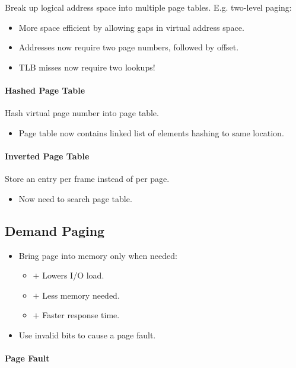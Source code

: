 \documentclass[twocolumn,english]{article}
\begin{document}
Break up logical address space into multiple page tables. E.g. two-level
paging:
\begin{itemize}
\item More space efficient by allowing gaps in virtual address space.
\item Addresses now require two page numbers, followed by offset.
\item TLB misses now require two lookups!
\end{itemize}

\paragraph{Hashed Page Table}

Hash virtual page number into page table.
\begin{itemize}
\item Page table now contains linked list of elements hashing to same location.
\end{itemize}

\paragraph{Inverted Page Table}

Store an entry per frame instead of per page.
\begin{itemize}
\item Now need to search page table.
\end{itemize}

\subsection{Demand Paging}
\begin{itemize}
\item Bring page into memory only when needed:
\begin{itemize}
\item $+$ Lowers I/O load.
\item $+$ Less memory needed.
\item $+$ Faster response time.
\end{itemize}
\item Use invalid bits to cause a page fault.
\end{itemize}

\paragraph{Page Fault}
\end{document}
